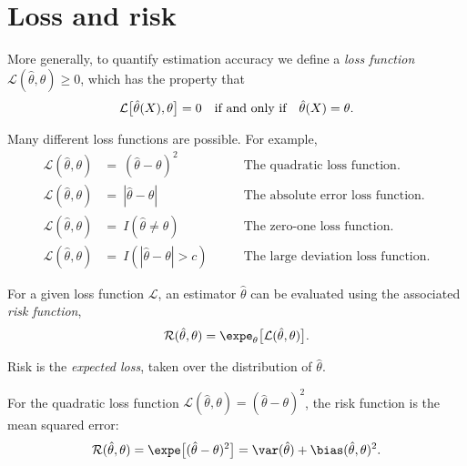 \section{Loss and risk}

More generally, to quantify estimation accuracy we define a \emph{loss function} $\mathcal{L}(\hat{\theta},\theta)\geq 0$, which has the property that 
\[
\mathcal{L}\big[\hat{\theta}(X),\theta\big]=0 \text{\quad if and only if\quad} \hat{\theta}(X)=\theta.
\]

Many different loss functions are possible. For example,
\[\begin{array}{lll}
\mathcal{L}(\hat{\theta},\theta)	& =\ (\hat{\theta}-\theta)^2		& \text{The quadratic loss function.} \\ 
\mathcal{L}(\hat{\theta},\theta)	& =\ |\hat{\theta}-\theta|			& \text{The absolute error loss function.} \\ 
\mathcal{L}(\hat{\theta},\theta)	& =\ I(\hat{\theta}\neq\theta)		& \text{The zero-one loss function.} \\ 
\mathcal{L}(\hat{\theta},\theta)	& =\ I(|\hat{\theta}-\theta|>c)\qquad\mbox{}	& \text{The large deviation loss function.} 
\end{array}\]

For a given loss function $\mathcal{L}$, an estimator $\hat{\theta}$ can be evaluated using the associated \emph{risk function},
\[
\mathcal{R}(\hat{\theta},\theta) = \expe_{\theta}\big[\mathcal{L}(\hat{\theta},\theta)\big].
\]

\vspace*{2ex}
Risk is the \emph{expected loss}, taken over the distribution of $\hat{\theta}$.

\begin{example}
For the quadratic loss function $\mathcal{L}(\hat{\theta},\theta) = (\hat{\theta}-\theta)^2$, the risk function is the mean squared error:
\[
\mathcal{R}(\hat{\theta},\theta) 
	= \expe\big[(\hat{\theta}-\theta)^2\big]
	= \var(\hat{\theta}) + \bias(\hat{\theta},\theta)^2.
\]
\end{example}

